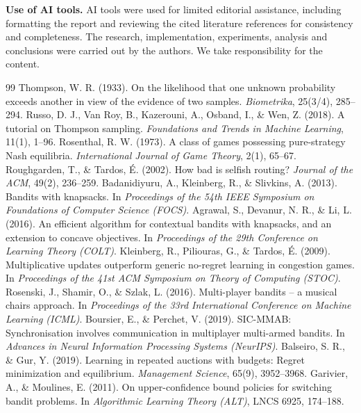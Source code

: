 \documentclass{article}
\begin{document}
\textbf{Use of AI tools.} AI tools were used for limited
editorial assistance, including formatting the report and
reviewing the cited literature references for consistency
and completeness. The research, implementation, experiments,
analysis and conclusions were carried out by the authors.
We take responsibility for the content.

\begin{thebibliography}{99}
\small\setlength{\itemsep}{1pt}\setlength{\parskip}{0pt}
 Thompson, W. R. (1933). On the likelihood that one unknown probability exceeds another in view of the evidence of two samples. \textit{Biometrika}, 25(3/4), 285--294.
 Russo, D. J., Van Roy, B., Kazerouni, A., Osband, I., \& Wen, Z. (2018). A tutorial on Thompson sampling. \textit{Foundations and Trends in Machine Learning}, 11(1), 1--96.
 Rosenthal, R. W. (1973). A class of games possessing pure-strategy Nash equilibria. \textit{International Journal of Game Theory}, 2(1), 65--67.
 Roughgarden, T., \& Tardos, \'E. (2002). How bad is selfish routing? \textit{Journal of the ACM}, 49(2), 236--259.
 Badanidiyuru, A., Kleinberg, R., \& Slivkins, A. (2013). Bandits with knapsacks. In \textit{Proceedings of the 54th IEEE Symposium on Foundations of Computer Science (FOCS)}.
 Agrawal, S., Devanur, N. R., \& Li, L. (2016). An efficient algorithm for contextual bandits with knapsacks, and an extension to concave objectives. In \textit{Proceedings of the 29th Conference on Learning Theory (COLT)}.
 Kleinberg, R., Piliouras, G., \& Tardos, \'E. (2009). Multiplicative updates outperform generic no-regret learning in congestion games. In \textit{Proceedings of the 41st ACM Symposium on Theory of Computing (STOC)}.
 Rosenski, J., Shamir, O., \& Szlak, L. (2016). Multi-player bandits -- a musical chairs approach. In \textit{Proceedings of the 33rd International Conference on Machine Learning (ICML)}.
 Boursier, E., \& Perchet, V. (2019). SIC-MMAB: Synchronisation involves communication in multiplayer multi-armed bandits. In \textit{Advances in Neural Information Processing Systems (NeurIPS)}.
 Balseiro, S. R., \& Gur, Y. (2019). Learning in repeated auctions with budgets: Regret minimization and equilibrium. \textit{Management Science}, 65(9), 3952--3968.
 Garivier, A., \& Moulines, E. (2011). On upper-confidence bound policies for switching bandit problems. In \textit{Algorithmic Learning Theory (ALT)}, LNCS 6925, 174--188.

\end{thebibliography}
\end{document}
